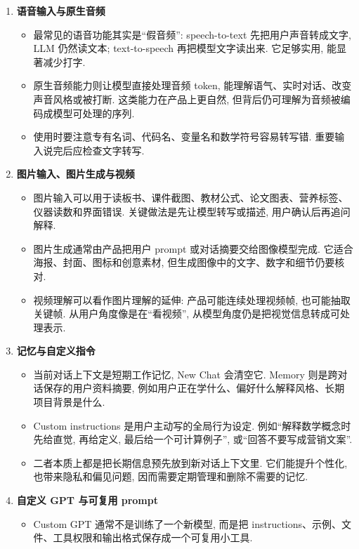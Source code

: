 \documentclass{../nndlcourse}
\begin{document}
\begin{enumerate}
  \item \textbf{语音输入与原生音频}
    \begin{itemize}
      \item 最常见的语音功能其实是“假音频”: speech-to-text 先把用户声音转成文字, LLM 仍然读文本; text-to-speech 再把模型文字读出来. 它足够实用, 能显著减少打字.
      \item 原生音频能力则让模型直接处理音频 token, 能理解语气、实时对话、改变声音风格或被打断. 这类能力在产品上更自然, 但背后仍可理解为音频被编码成模型可处理的序列.
      \item 使用时要注意专有名词、代码名、变量名和数学符号容易转写错. 重要输入说完后应检查文字转写.
    \end{itemize}
  \item \textbf{图片输入、图片生成与视频}
    \begin{itemize}
      \item 图片输入可以用于读板书、课件截图、教材公式、论文图表、营养标签、仪器读数和界面错误. 关键做法是先让模型转写或描述, 用户确认后再追问解释.
      \item 图片生成通常由产品把用户 prompt 或对话摘要交给图像模型完成. 它适合海报、封面、图标和创意素材, 但生成图像中的文字、数字和细节仍要核对.
      \item 视频理解可以看作图片理解的延伸: 产品可能连续处理视频帧, 也可能抽取关键帧. 从用户角度像是在“看视频”, 从模型角度仍是把视觉信息转成可处理表示.
    \end{itemize}
  \item \textbf{记忆与自定义指令}
    \begin{itemize}
      \item 当前对话上下文是短期工作记忆, New Chat 会清空它. Memory 则是跨对话保存的用户资料摘要, 例如用户正在学什么、偏好什么解释风格、长期项目背景是什么.
      \item Custom instructions 是用户主动写的全局行为设定. 例如“解释数学概念时先给直觉, 再给定义, 最后给一个可计算例子”, 或“回答不要写成营销文案”.
      \item 二者本质上都是把长期信息预先放到新对话上下文里. 它们能提升个性化, 也带来隐私和偏见问题, 因而需要定期管理和删除不需要的记忆.
    \end{itemize}
  \item \textbf{自定义 GPT 与可复用 prompt}
    \begin{itemize}
      \item Custom GPT 通常不是训练了一个新模型, 而是把 instructions、示例、文件、工具权限和输出格式保存成一个可复用小工具.

\end{itemize}
\end{enumerate}
\end{document}
